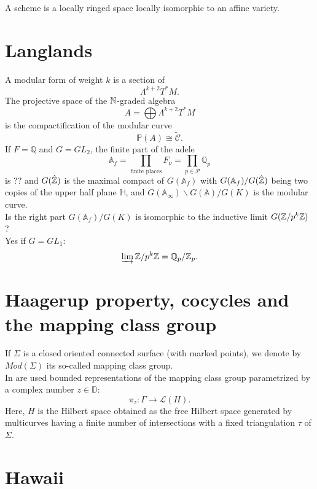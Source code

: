 \begin{definition}
A scheme is a locally ringed space locally isomorphic to an affine variety.
\end{definition}

\section{Langlands}   %

A modular form of weight $k$ is a section of 
\[\Lambda^{k+2}T^*M.\]
The projective space of the $\mathbb N$-graded algebra \[A=\bigoplus \Lambda^{k+2}T^*M\] is the compactification of the modular curve
\[\mathbb P(A) \cong \tilde{\mathcal C}.\]
If $F=\mathbb Q$ and $G= GL_2$, the finite part of the adele
\[\mathbb A_f = \prod_{\text{finite places}} F_\nu = \prod_{p \in \mathcal P} \mathbb Q_p\]
is ?? and $G(\hat{\mathbb Z})$ is the maximal compact of $G(\mathbb A_f)$ with $G(\mathbb A_f ) / G(\hat {\mathbb Z})$ being two copies of the upper half plane $\mathbb H$, and $G(\mathbb A_\infty) \backslash G(\mathbb A) / G(K)$ is the modular curve.\\

Is the right part $G(\mathbb A_f)/ G(K)$ is isomorphic to the inductive limit $G(\mathbb Z / p^k \mathbb Z)$ ?\\

Yes if $G= GL_1$: \[ \varinjlim \mathbb Z / p^k \mathbb Z = \mathbb Q_p / \mathbb Z_p.\]

\section{Haagerup property, cocycles and the mapping class group}

If $\Sigma$ is a closed oriented connected surface (with marked points), we denote by $Mod(\Sigma)$ its so-called mapping class group.\\

In \cite{CostantinoMartelli} are used bounded representations of the mapping class group parametrized by a complex number $z\in \mathbb D$:
\[\pi_z : \Gamma \rightarrow \mathcal L(H).\]
Here, $H$ is the Hilbert space obtained as the free Hilbert space generated by multicurves having a finite number of intersections with a fixed triangulation $\tau$ of $\Sigma$. 

\section{Hawaii}

